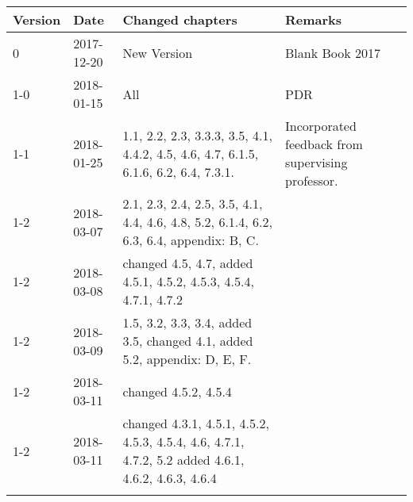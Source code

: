 \begin{longtable}{|p{}| p{} |p{} |p{}|}\hline
    \centering
    \textbf{Version}    & \textbf{Date}     & \textbf{Changed chapters} & \textbf{Remarks} \\\hline
    0       &   2017-12-20   & New Version   & Blank Book 2017  \\
    1-0     &   2018-01-15   & All           & PDR \\ 
    1-1     &   2018-01-25   & 1.1, 2.2, 2.3, 3.3.3, 3.5, 4.1, 4.4.2, 4.5, 4.6, 4.7, 6.1.5, 6.1.6, 6.2, 6.4, 7.3.1. & Incorporated feedback from supervising professor.\\ 
    1-2     &   2018-03-07   & 2.1, 2.3, 2.4, 2.5, 3.5, 4.1, 4.4, 4.6, 4.8, 5.2, 6.1.4, 6.2, 6.3, 6.4, appendix: B, C.     &    \\\hline 
    1-2     &   2018-03-08   & changed 4.5, 4.7, added 4.5.1, 4.5.2, 4.5.3, 4.5.4, 4.7.1, 4.7.2     &    \\\hline
    1-2     &   2018-03-09   & 1.5, 3.2, 3.3, 3.4, added 3.5, changed 4.1, added 5.2,  appendix: D, E, F.     &    \\\hline 
    1-2     &   2018-03-11   & changed 4.5.2, 4.5.4  &    \\\hline 
    1-2     &   2018-03-11   & changed 4.3.1, 4.5.1, 4.5.2, 4.5.3, 4.5.4, 4.6, 4.7.1, 4.7.2, 5.2 added 4.6.1, 4.6.2, 4.6.3, 4.6.4 &    \\\hline 
   
    \label{COR}
\end{longtable}